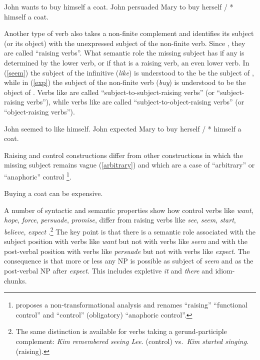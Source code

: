 \eal
\label{ex-equi}
\ex John wants to buy himself a coat. \label{equi1}
\ex John persuaded Mary to buy herself / * himself a coat.\label{equi2}
\zl

Another type of verb also takes a non-finite complement and identifies its subject (or its object)
with the unexpressed subject of the non-finite verb. Since \citet{Postal1974}, they are called
``raising verbs''. What semantic role the missing subject has if any is determined by the lower
verb, or if that is a raising verb, an even lower verb. In (\ref{seem}) the subject of the
infinitive (\emph{like}) is understood to the be the subject of , while in (\ref{exp})
the subject of the non-finite verb (\emph{buy}) is understood to be the object of
. Verbs like  are called ``subject-to-subject-raising verbs'' (or
``subject-raising verbs''), while verbs like  are called ``subject-to-object-raising
verbs'' (or ``object-raising verbs''). 

\eal
\ex John seemed to like himself.\label{seem}
\ex John expected Mary to buy herself / * himself a coat. \label{exp}
\zl
 
Raising and control constructions differ from other constructions in which the missing subject
remains vague (\ref{arbitrary}) and which are a case of ``arbitrary'' or ``anaphoric'' control
\parencites[--76]{Chomsky1981}[]{Bresnan1982}\footnote{\citet{Bresnan1982} proposes
  a non-transformational analysis and renames ``raising'' ``functional control'' and ``control''
  (obligatory) ``anaphoric control''.%
}. 
 
\ea
Buying a coat can be expensive.\label{arbitrary}
\z
  
A number of syntactic and semantic properties show how control verbs like \emph{want}, \emph{hope},
\emph{force}, \emph{persuade}, \emph{promise}, differ from raising verbs like \emph{see},
\emph{seem}, \emph{start}, \emph{believe}, \emph{expect} \citep{Rosenbaum67a-u,Postal1974,Bresnan1982}.\footnote{%
  The same distinction is available for verbs taking a gerund-participle complement: 
  \emph{Kim remembered seeing Lee.} (control) vs.\  \emph{Kim started singing.} (raising).%
}
The key point is that there is a semantic role associated with the subject position with verbs like
\emph{want} but not with verbs like \emph{seem} and with the post-verbal position with verbs like
\emph{persuade} but not with verbs like \emph{expect}.  The consequence is that more or less any NP
is possible as subject of \emph{seem} and as the post-verbal NP after \emph{expect}. This includes
expletive \emph{it} and \emph{there} and idiom-chunks.

